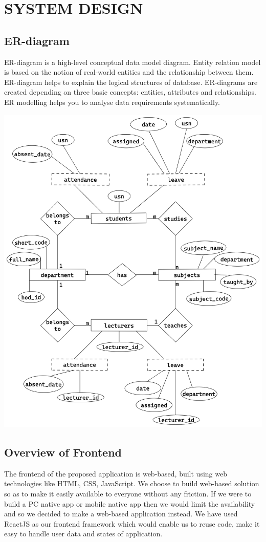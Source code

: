 \section{SYSTEM DESIGN}

\subsection{ER-diagram}
ER-diagram is a high-level conceptual data model diagram. Entity
relation model is based on the notion of real-world entities and the
relationship between them. ER-diagram helps to explain the logical structures of
database. ER-diagrams are created depending on three basic concepts: entities,
attributes  and relationships. ER modelling helps you to analyse data
requirements systematically.

\vspace{1cm}
\includegraphics[width=14.5cm]{assets/er.jpeg}

\newpage
\subsection{Overview of Frontend}
The frontend of the proposed application is web-based, built using web
technologies like HTML, CSS, JavaScript. We choose to build web-based solution
so as to make it easily available to everyone without any friction. If we were
to build a PC native app or mobile native app then we would limit the
availability and so we decided to make a web-based application instead. We have
used ReactJS as our frontend framework which would enable us to reuse code, make
it easy to handle user data and states of application.

